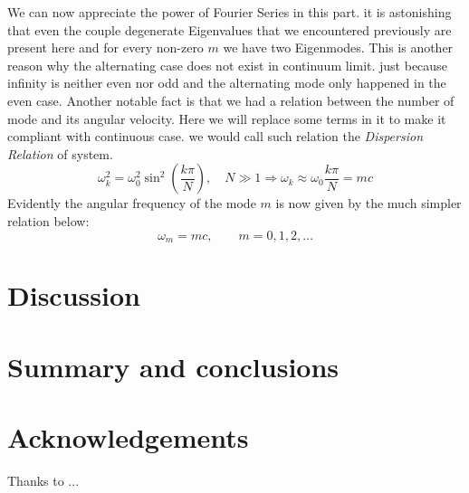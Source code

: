 \documentclass[final,5p,times,twocolumn,authoryear]{elsarticle}
\begin{document}
We can now appreciate the power of Fourier Series in this part. it is astonishing that even the couple degenerate Eigenvalues that we encountered previously are present here and for every non-zero $m$ we have two Eigenmodes. This is another reason why the alternating case does not exist in continuum limit. just because infinity is neither even nor odd and the alternating mode only happened in the even case. Another notable fact is that we had a relation between the number of mode and its angular velocity. Here we will replace some terms in it to make it compliant with continuous case. we would call such relation the \textit{Dispersion Relation} of system.
\[ \omega_k^2 = \omega_0^2\sin^2\left(\frac{k\pi}{N}\right), \quad N \gg 1 \Rightarrow \omega_k \approx \omega_0 \frac{k\pi}{N} = mc \]
Evidently the angular frequency of the mode $m$ is now given by the much simpler relation below:
\begin{equation}
	\omega_m = m c ,\qquad m = 0,1,2,\dots
\end{equation}


\section{Discussion}

\section{Summary and conclusions}


\section*{Acknowledgements}
Thanks to ...


 







\end{document}
